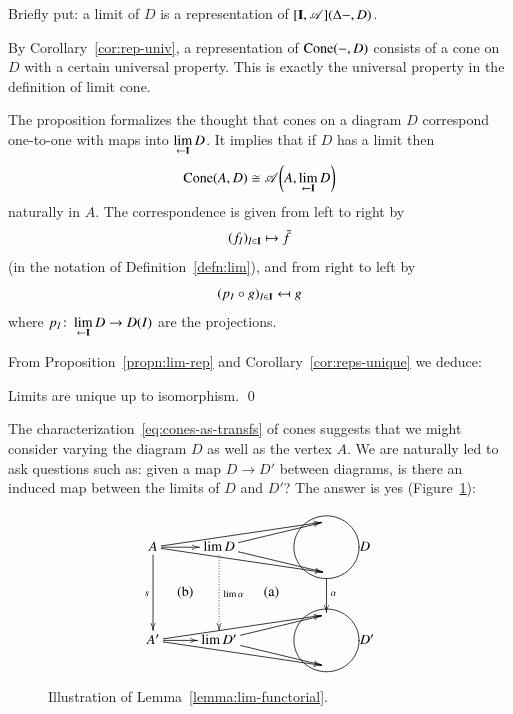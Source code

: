 Briefly put: a limit of $D$ is a representation of
$[\mathbf{I},\mathscr{A}](\Delta-, D)$.

\begin{pf}
By Corollary~\ref{cor:rep-univ}, a representation of $\operatorname{Cone}(-, D)$
consists of a cone on $D$ with a certain universal property.  This is exactly
the universal property in the definition of limit cone.
\end{pf}

The proposition formalizes the thought that cones on a diagram $D$
correspond one-to-one with maps into $\lim\limits_{\leftarrow \mathbf{I}} D$.  It implies that if
$D$ has a limit then
%
\begin{equation}
\label{eq:cone-is-map-to-lim}
\operatorname{Cone}(A, D) \cong \mathscr{A}\biggl(A, \lim\limits_{\leftarrow \mathbf{I}} D\biggr)
\end{equation}
%
naturally in $A$.  The correspondence is given from left to right by
\[
(f_I)_{I \in \mathbf{I}} \mapsto \bar{f}
\]
(in the notation of Definition~\ref{defn:lim}), and from right to left by
\[
(p_I \of g)_{I \in \scat{I}} \mapsfrom g
\]
where $p_I\from \lt{\scat{I}} D \to D(I)$ are the projections.

From Proposition~\ref{propn:lim-rep} and Corollary~\ref{cor:reps-unique} we
deduce:
%
\begin{cor}
\label{cor:lims-unique}
%
%
Limits are unique up to isomorphism.
\qed
\end{cor}

The characterization~\eqref{eq:cones-as-transfs} of cones suggests that we
might consider varying the diagram $D$ as well as the vertex $A$.  We are
naturally led to ask questions such as: given a map $D \to D'$ between
diagrams, is there an induced map between the limits of $D$ and $D'$?  The
answer is yes (Figure~\ref{fig:induced-maps}):

\begin{figure}
\[
\xymatrix@R=2ex{
        &       &\,      \\
A \ar[r] \ar[dddd]_s
\ar[rru] \ar[rrd]
\ar@{}[rdddd]|-{\text{\normalsize(b)}}&
\lim D \ar@{.>}[dddd]^{\lim \alpha}
\ar[ru] \ar[rd]
\ar@{}[rdddd]|-{\text{\normalsize(a)}}&
\save*+<10ex>[o][F]{\,}\restore \hspace*{5.5em}D
        \\
        &       & \ar[dd]^\alpha        \\
        &       &        \\
        &       &\,      \\
A' \ar[r]
\ar[rru] \ar[rrd]       &
\lim D' \ar[ru] \ar[rd]         &
\save*+<10ex>[o][F]{\,}\restore \hspace*{5.8em}D'
\\
        &       &\,
}
\]
\caption{Illustration of Lemma~\ref{lemma:lim-functorial}.}
\label{fig:induced-maps}
\end{figure}

